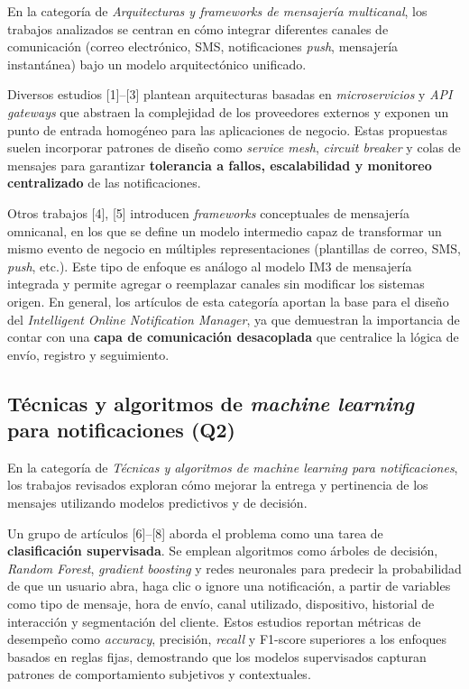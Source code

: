 \documentclass[conference]{IEEEtran}
\begin{document}
En la categoría de \textit{Arquitecturas y frameworks de mensajería multicanal}, los trabajos analizados se centran en cómo integrar diferentes canales de comunicación (correo electrónico, SMS, notificaciones \textit{push}, mensajería instantánea) bajo un modelo arquitectónico unificado.

Diversos estudios [1]--[3] plantean arquitecturas basadas en \textit{microservicios} y \textit{API gateways} que abstraen la complejidad de los proveedores externos y exponen un punto de entrada homogéneo para las aplicaciones de negocio. Estas propuestas suelen incorporar patrones de diseño como \textit{service mesh}, \textit{circuit breaker} y colas de mensajes para garantizar \textbf{tolerancia a fallos, escalabilidad y monitoreo centralizado} de las notificaciones.

Otros trabajos [4], [5] introducen \textit{frameworks} conceptuales de mensajería omnicanal, en los que se define un modelo intermedio capaz de transformar un mismo evento de negocio en múltiples representaciones (plantillas de correo, SMS, \textit{push}, etc.). Este tipo de enfoque es análogo al modelo IM3 de mensajería integrada y permite agregar o reemplazar canales sin modificar los sistemas origen. En general, los artículos de esta categoría aportan la base para el diseño del \textit{Intelligent Online Notification Manager}, ya que demuestran la importancia de contar con una \textbf{capa de comunicación desacoplada} que centralice la lógica de envío, registro y seguimiento.

\subsection{Técnicas y algoritmos de \textit{machine learning} para notificaciones (Q2)}

En la categoría de \textit{Técnicas y algoritmos de machine learning para notificaciones}, los trabajos revisados exploran cómo mejorar la entrega y pertinencia de los mensajes utilizando modelos predictivos y de decisión.

Un grupo de artículos [6]--[8] aborda el problema como una tarea de \textbf{clasificación supervisada}. Se emplean algoritmos como árboles de decisión, \textit{Random Forest}, \textit{gradient boosting} y redes neuronales para predecir la probabilidad de que un usuario abra, haga clic o ignore una notificación, a partir de variables como tipo de mensaje, hora de envío, canal utilizado, dispositivo, historial de interacción y segmentación del cliente. Estos estudios reportan métricas de desempeño como \textit{accuracy}, precisión, \textit{recall} y F1-score superiores a los enfoques basados en reglas fijas, demostrando que los modelos supervisados capturan patrones de comportamiento subjetivos y contextuales.
\end{document}
